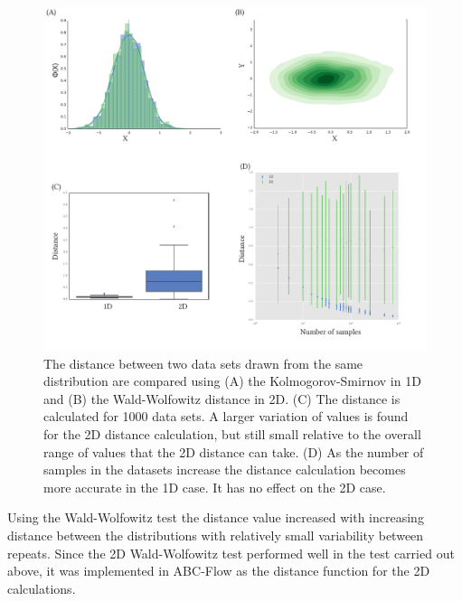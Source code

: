 \begin{figure}[tb]
\centering
\includegraphics[scale=0.7]{../../chapters/chapterABCFlow/images/epsilon_same_box.pdf}
\caption[Distance calculation expected error using the KS and Wald-Wolfowitz distances]{\label{fig:epsilon_boxplt}The distance between two data sets drawn from the same distribution are compared using (A) the Kolmogorov-Smirnov in 1D and (B) the Wald-Wolfowitz distance in 2D. (C) The distance is calculated for 1000 data sets. A larger variation of values is found for the 2D distance calculation, but still small relative to the overall range of values that the 2D distance can take. (D) As the number of samples in the datasets increase the distance calculation becomes more accurate in the 1D case. It has no effect on the 2D case.}
\end{figure}


Using the Wald-Wolfowitz test the distance value increased with increasing distance between the distributions with relatively small variability between repeats. Since the 2D Wald-Wolfowitz test performed well in the test carried out above, it was implemented in ABC-Flow as the distance function for the 2D calculations.


